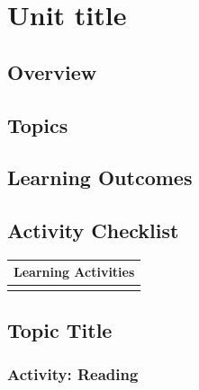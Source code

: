 \documentclass[
]{book}
\begin{document}
\hypertarget{unit-title-1}{%
\chapter{Unit title}\label{unit-title-1}}

\hypertarget{overview-1}{%
\section*{Overview}\label{overview-1}}

\hypertarget{topics-1}{%
\section*{Topics}\label{topics-1}}

\hypertarget{learning-outcomes-1}{%
\section*{Learning Outcomes}\label{learning-outcomes-1}}

\hypertarget{activity-checklist-1}{%
\section*{Activity Checklist}\label{activity-checklist-1}}

\begin{longtable}[]{@{}l@{}}
\toprule
Learning Activities \\
\midrule
\endhead
 \\
\bottomrule
\end{longtable}

\hypertarget{topic-title-1}{%
\section*{Topic Title}\label{topic-title-1}}

\hypertarget{activity-reading}{%
\subsection*{Activity: Reading}\label{activity-reading}}

\begin{reflect}

\end{reflect}
\end{document}
